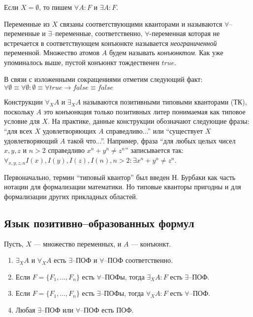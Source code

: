 Если $X = \emptyset$, то пишем $\forall A\colon F$ и $\exists A\colon F$.


Переменные из $X$ связаны соответствующими кванторами и называются $\forall$--переменные и $\exists$--переменные, соответственно, $\forall$-переменная которая не встречается в соответствующем конъюнкте называется {\em неограниченной} переменной. Множество атомов $A$ будем называть {\em конъюнктом}. Как уже упоминалось выше, пустой конъюнкт тождественен $true$.

В связи с изложенными сокращениями отметим следующий факт: $\forall \emptyset \equiv \forall \emptyset:\emptyset \equiv \forall true \rightarrow false \equiv false$

Конструкции $\forall_XA$ и $\exists_XA$ называются позитивными типовыми кванторами (ТК), поскольку $A$ это конъюнкция только позитивных литер понимаемая как типовое условие для $X$. На практике, данные конструкции обозначают следующие фразы: ``для всех $X$ удовлетворяющих $A$ справедливо...'' или ``существует $X$ удовлетворяющий $A$ такой что...''. Например, фраза ``для любых целых чисел $x,y,z$ и $n>2$ справедливо $x^n + y^n \ne z^n$'' записывается так: $\forall_{x,y,z,n}I(x),I(y),I(z),I(n),n>2:\exists x^n + y^n \ne z^n$.

Первоначально, термин ``типовый квантор'' был введен Н. Бурбаки \cite{Bourbaki} как часть нотации для формализации математики. Но типовые кванторы пригодны и для формализации других прикладных областей.



\subsection{Язык позитивно--образованных формул}


\begin{definition}
\label{def:pcf}
Пусть, $X$ --- множество переменных, и $A$ --- конъюнкт.
\begin{enumerate}

\item $\exists_XA$ и $\forall_XA$ есть $\exists$--ПОФ и $\forall$--ПОФ соответственно.

\item Если $F = \{F_1,\ldots,F_n\}$ есть $\forall$--ПОФы, тогда $\exists_XA\colon F$ есть $\exists$--ПОФ.

\item Если $F = \{F_1,\ldots,F_n\}$ есть $\exists$--ПОФы, тогда $\forall_XA\colon F$ есть $\forall$--ПОФ.

\item Любая $\exists$--ПОФ или $\forall$--ПОФ есть ПОФ.
\end{enumerate}
\end{definition}


